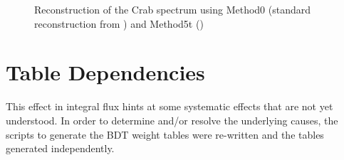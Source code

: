 \documentclass[main.tex]{subfiles}
\begin{document}
\begin{figure}[H]
  \begin{center}
  \end{center}
  \caption[Crab spectrum reconstruction]{Reconstruction of the Crab spectrum using Method0 (standard reconstruction from \vegas) and Method5t (\disp)}
  \label{fig:spectrum_compare}
\end{figure}

\section{\disp Table Dependencies}
This effect in integral flux hints at some systematic effects that are not yet understood. In order to determine and/or resolve the underlying causes, the scripts to generate the BDT weight tables were re-written and the tables generated independently.
\end{document}
